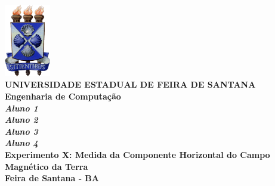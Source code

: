 \documentclass[a4paper,12pt]{article}
\begin{document}

\begin{titlepage}
    \begin{center}
        \includegraphics[width=0.15\textwidth]{Brasão_da_UEFS.png}\\[1.5cm]
        
        {\fontsize{18pt}{20pt}\bfseries UNIVERSIDADE ESTADUAL DE FEIRA DE SANTANA}\\[0.3cm]
        {\fontsize{18pt}{20pt}\bfseries Engenharia de Computação}\\[2cm]


        {\fontsize{14pt}{16pt}\bfseries\itshape Aluno 1}\\[0.1cm]
        {\fontsize{14pt}{16pt}\bfseries\itshape Aluno 2}\\[0.1cm]
        {\fontsize{14pt}{16pt}\bfseries\itshape Aluno 3}\\[0.1cm]
        {\fontsize{14pt}{16pt}\bfseries\itshape Aluno 4}\\[3cm]

        
        {\fontsize{18pt}{20pt}\bfseries Experimento X: Medida da Componente Horizontal do Campo Magnético da Terra}\\[2cm]

        
        \vfill
        {\fontsize{12pt}{14pt}\bfseries Feira de Santana - BA}\\
        {\fontsize{12pt}{14pt}\bfseries \the\year}
    \end{center}
\end{titlepage}
\end{document}
